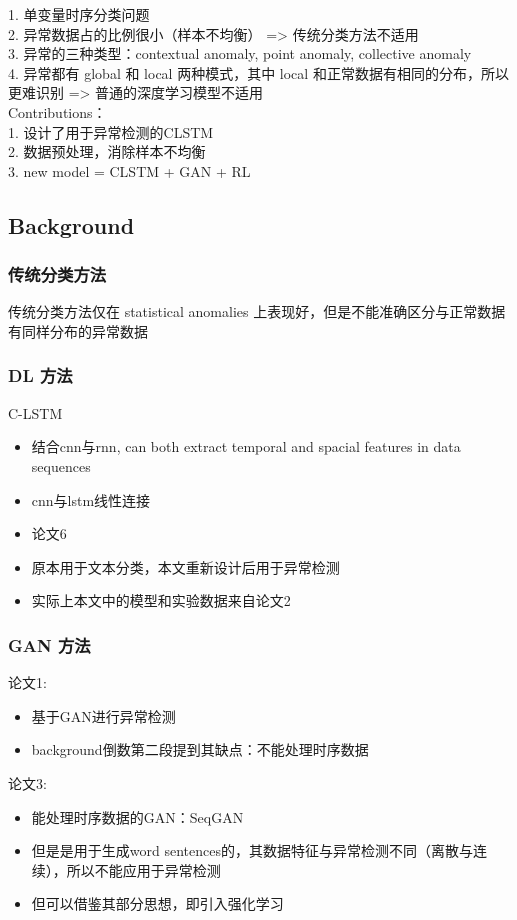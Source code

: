 \documentclass[12pt]{article}
\begin{document}
1. 单变量时序分类问题 \\
2. 异常数据占的比例很小（样本不均衡）  => 传统分类方法不适用 \\
3. 异常的三种类型：contextual anomaly, point anomaly, collective anomaly \\
4. 异常都有 global 和 local 两种模式，其中 local 和正常数据有相同的分布，所以更难识别  => 普通的深度学习模型不适用 \\

Contributions：\\
1. 设计了用于异常检测的CLSTM \\
2. 数据预处理，消除样本不均衡 \\
3. new model = CLSTM + GAN + RL \\


\subsection{\textbf{Background}}
\subsubsection{传统分类方法}
传统分类方法仅在 statistical anomalies 上表现好，但是不能准确区分与正常数据有同样分布的异常数据

\subsubsection{DL 方法}
C-LSTM
\begin{itemize}
\item 结合cnn与rnn, can both extract temporal and spacial features in data sequences
\item cnn与lstm线性连接
\item 论文6
\item 原本用于文本分类，本文重新设计后用于异常检测
\item 实际上本文中的模型和实验数据来自论文2
\end{itemize}

\subsubsection{GAN 方法}
论文1:
\begin{itemize}
\item 基于GAN进行异常检测

\item background倒数第二段提到其缺点：不能处理时序数据
\end{itemize}
论文3:
\begin{itemize}
\item 能处理时序数据的GAN：SeqGAN

\item 但是是用于生成word sentences的，其数据特征与异常检测不同（离散与连续），所以不能应用于异常检测

\item 但可以借鉴其部分思想，即引入强化学习
\end{itemize}
\end{document}
